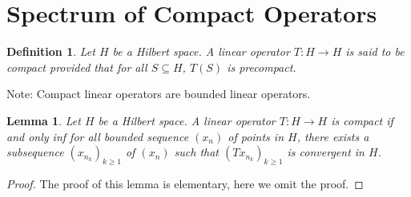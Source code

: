 \documentclass[11pt]{book}
\theoremstyle{break}
\theoremstyle{break}
\newtheorem{lem}{Lemma}[thm]
\newtheorem{defn}{Definition}[corL]
\newcommand{\note}{\color{red}Note: \color{black}}
\begin{document}
\newpage
\section[Spectrum of Compact Operators]{\color{red} Spectrum of Compact Operators\color{black}}
\begin{defn}
Let $H$ be a Hilbert space. A linear operator $T:H \to H$ is said to be compact provided that for all $S \subseteq H$, $T(S)$ is precompact. 
\end{defn}
\note Compact linear operators are bounded linear operators. 
\begin{lem}
Let $H$ be a Hilbert space. A linear operator $T:H \to H$ is compact if and only inf for all bounded sequence $(x_n)$ of points in $H$, there exists a subsequence $(x_{n_k})_{k\geq 1}$ of $(x_n)$ such that $(Tx_{n_k})_{k\geq 1}$ is convergent in $H$. 
\end{lem}
\begin{proof}
The proof of this lemma is elementary, here we omit the proof. 
\end{proof}
\end{document}

